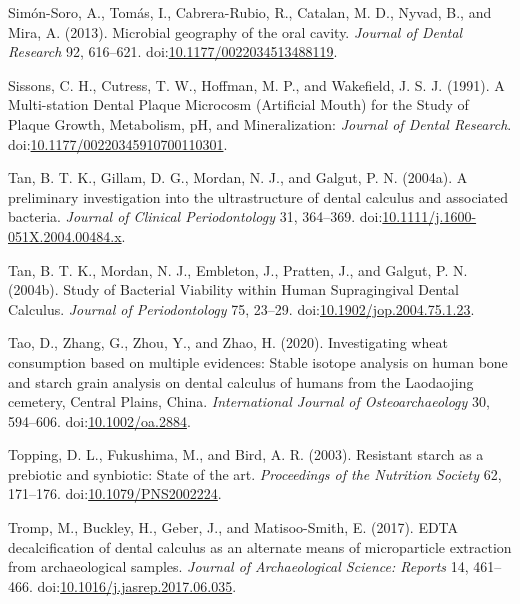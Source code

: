 \documentclass[utf8]{frontiers/frontiersSCNS}
\newlength{\cslhangindent}
\newlength{\cslentryspacingunit} %
\newenvironment{CSLReferences}[2] %
 {%
  \setlength{\parindent}{0pt}
  \ifodd #1
  \let\oldpar\par
  \def\par{\hangindent=\cslhangindent\oldpar}
  \fi
  \setlength{\parskip}{#2\cslentryspacingunit}
 }%
 {}
\begin{document}
\begin{CSLReferences}{1}{0}
\leavevmode{}%
Simón-Soro, A., Tomás, I., Cabrera-Rubio, R., Catalan, M. D., Nyvad, B., and Mira, A. (2013). Microbial geography of the oral cavity. \emph{Journal of Dental Research} 92, 616--621. doi:\href{https://doi.org/10.1177/0022034513488119}{10.1177/0022034513488119}.

\leavevmode{}%
Sissons, C. H., Cutress, T. W., Hoffman, M. P., and Wakefield, J. S. J. (1991). A {Multi-station Dental Plaque Microcosm} ({Artificial Mouth}) for the {Study} of {Plaque Growth}, {Metabolism}, {pH}, and {Mineralization}: \emph{Journal of Dental Research}. doi:\href{https://doi.org/10.1177/00220345910700110301}{10.1177/00220345910700110301}.

\leavevmode{}%
Tan, B. T. K., Gillam, D. G., Mordan, N. J., and Galgut, P. N. (2004a). A preliminary investigation into the ultrastructure of dental calculus and associated bacteria. \emph{Journal of Clinical Periodontology} 31, 364--369. doi:\href{https://doi.org/10.1111/j.1600-051X.2004.00484.x}{10.1111/j.1600-051X.2004.00484.x}.

\leavevmode{}%
Tan, B. T. K., Mordan, N. J., Embleton, J., Pratten, J., and Galgut, P. N. (2004b). Study of {Bacterial Viability} within {Human Supragingival Dental Calculus}. \emph{Journal of Periodontology} 75, 23--29. doi:\href{https://doi.org/10.1902/jop.2004.75.1.23}{10.1902/jop.2004.75.1.23}.

\leavevmode{}%
Tao, D., Zhang, G., Zhou, Y., and Zhao, H. (2020). Investigating wheat consumption based on multiple evidences: {Stable} isotope analysis on human bone and starch grain analysis on dental calculus of humans from the {Laodaojing} cemetery, {Central Plains}, {China}. \emph{International Journal of Osteoarchaeology} 30, 594--606. doi:\href{https://doi.org/10.1002/oa.2884}{10.1002/oa.2884}.

\leavevmode{}%
Topping, D. L., Fukushima, M., and Bird, A. R. (2003). Resistant starch as a prebiotic and synbiotic: State of the art. \emph{Proceedings of the Nutrition Society} 62, 171--176. doi:\href{https://doi.org/10.1079/PNS2002224}{10.1079/PNS2002224}.

\leavevmode{}%
Tromp, M., Buckley, H., Geber, J., and Matisoo-Smith, E. (2017). {EDTA} decalcification of dental calculus as an alternate means of microparticle extraction from archaeological samples. \emph{Journal of Archaeological Science: Reports} 14, 461--466. doi:\href{https://doi.org/10.1016/j.jasrep.2017.06.035}{10.1016/j.jasrep.2017.06.035}.


\end{CSLReferences}
\end{document}
